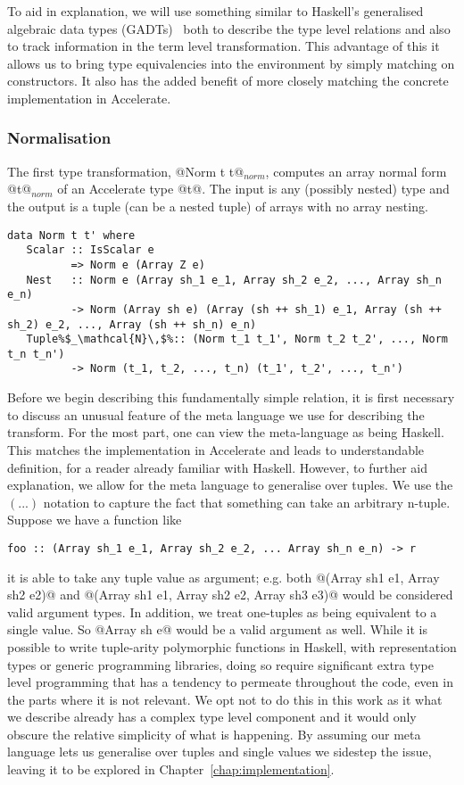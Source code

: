 To aid in explanation, we will use something similar to Haskell's generalised algebraic data types (GADTs)~\citep{Jones:2006eh} both to describe the type level relations and also to track information in the term level transformation. This advantage of this it allows us to bring type equivalencies into the environment by simply matching on constructors. It also has the added benefit of more closely matching the concrete implementation in Accelerate.

\subsubsection{Normalisation}
The first type transformation, @Norm t t@$_{\textit{norm}}$, computes an array normal form @t@$_{\textit{norm}}$ of an Accelerate type @t@. The input is any (possibly nested) type and the output is a tuple (can be a nested tuple) of arrays with no array nesting.

\begin{lstlisting}[style=ndp]
data Norm t t' where
   Scalar :: IsScalar e
          => Norm e (Array Z e)
   Nest   :: Norm e (Array sh_1 e_1, Array sh_2 e_2, ..., Array sh_n e_n)
          -> Norm (Array sh e) (Array (sh ++ sh_1) e_1, Array (sh ++ sh_2) e_2, ..., Array (sh ++ sh_n) e_n)
   Tuple%$_\mathcal{N}\,$%:: (Norm t_1 t_1', Norm t_2 t_2', ..., Norm t_n t_n')
          -> Norm (t_1, t_2, ..., t_n) (t_1', t_2', ..., t_n')
\end{lstlisting}

Before we begin describing this fundamentally simple relation, it is first necessary to discuss an unusual feature of the meta language we use for describing the transform. For the most part, one can view the meta-language as being Haskell. This matches the implementation in Accelerate and leads to understandable definition, for a reader already familiar with Haskell. However, to further aid explanation, we allow for the meta language to generalise over tuples. We use the $(...)$ notation to capture the fact that something can take an arbitrary n-tuple. Suppose we have a function like
%
\begin{lstlisting}
foo :: (Array sh_1 e_1, Array sh_2 e_2, ... Array sh_n e_n) -> r
\end{lstlisting}
%
it is able to take any tuple value as argument; e.g. both @(Array sh1 e1, Array sh2 e2)@ and @(Array sh1 e1, Array sh2 e2, Array sh3 e3)@ would be considered valid argument types. In addition, we treat one-tuples as being equivalent to a single value. So @Array sh e@ would be a valid argument as well. While it is possible to write tuple-arity polymorphic functions in Haskell, with representation types or generic programming libraries, doing so require significant extra type level programming that has a tendency to permeate throughout the code, even in the parts where it is not relevant. We opt not to do this in this work as it what we describe already has a complex type level component and it would only obscure the relative simplicity of what is happening. By assuming our meta language lets us generalise over tuples and single values we sidestep the issue, leaving it to be explored in Chapter~\ref{chap:implementation}.


